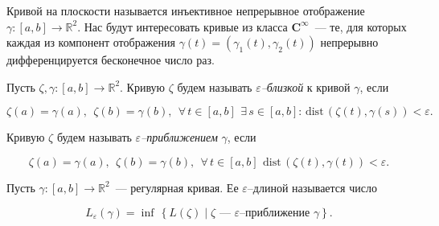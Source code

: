 ﻿

\def\dist{\mathrm{dist}\,} \def\ve{\varepsilon}

\noindent Кривой на плоскости называется инъективное непрерывное отображение $\gamma \colon [a,b] \rightarrow {\mathbb R}^2$. Нас будут интересовать кривые из класса $\mathbf C^\infty$~--- те, для которых каждая из компонент отображения $\gamma(t) = (\gamma_1 (t), \gamma_2 (t))$ непрерывно дифференцируется бесконечное число раз.

\medskip\par\noindent Пусть $\zeta, \gamma \colon [a,b] \longrightarrow {\mathbb R}^2$. Кривую $\zeta$ будем называть {\itshape $\varepsilon$--близкой} к кривой $\gamma$, если

\vspace{-0.2cm}
$$ \zeta(a) = \gamma(a),\ \ \zeta(b) = \gamma(b),\ \ 
\forall\,t \in [a,b]\ \,\exists\,s \in [a,b] \colon
\,\dist(\zeta(t), \gamma(s)) < \varepsilon.$$
\vspace{-0.4cm}

\medskip\par\noindent  Кривую $\zeta$ будем называть {\itshape $\varepsilon$--приближением} $\gamma$, если

\vspace{-0.2cm}
$$ \zeta(a) = \gamma(a),\ \ \zeta(b) = \gamma(b),\ \ 
\forall\,t \in [a,b]\ \,\dist(\zeta(t), \gamma(t)) < \varepsilon.$$
\vspace{-0.4cm}

\medskip\par\noindent  Пусть $\gamma \colon [a,b] \rightarrow {\mathbb R}^2$~--- регулярная кривая. Ее $\varepsilon$--длиной называется число

\vspace{-0.2cm}
$$L_\varepsilon (\gamma) =
\inf \,\left\{
	L(\zeta)  \mid  \text{$\zeta$~--- $\varepsilon$--приближение $\gamma$}
\right\}.$$
\vspace{-0.65cm}

